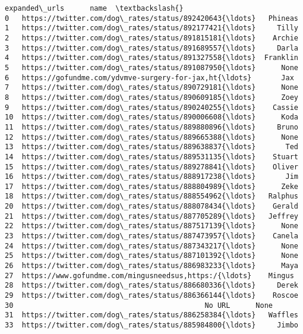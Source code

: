 \documentclass[11pt]{article}
\begin{document}
\begin{Verbatim}[commandchars=\\\{\}]
                                        expanded\_urls      name  \textbackslash{}
0   https://twitter.com/dog\_rates/status/892420643{\ldots}   Phineas   
1   https://twitter.com/dog\_rates/status/892177421{\ldots}     Tilly   
2   https://twitter.com/dog\_rates/status/891815181{\ldots}    Archie   
3   https://twitter.com/dog\_rates/status/891689557{\ldots}     Darla   
4   https://twitter.com/dog\_rates/status/891327558{\ldots}  Franklin   
5   https://twitter.com/dog\_rates/status/891087950{\ldots}      None   
6   https://gofundme.com/ydvmve-surgery-for-jax,ht{\ldots}       Jax   
7   https://twitter.com/dog\_rates/status/890729181{\ldots}      None   
8   https://twitter.com/dog\_rates/status/890609185{\ldots}      Zoey   
9   https://twitter.com/dog\_rates/status/890240255{\ldots}    Cassie   
10  https://twitter.com/dog\_rates/status/890006608{\ldots}      Koda   
11  https://twitter.com/dog\_rates/status/889880896{\ldots}     Bruno   
12  https://twitter.com/dog\_rates/status/889665388{\ldots}      None   
13  https://twitter.com/dog\_rates/status/889638837{\ldots}       Ted   
14  https://twitter.com/dog\_rates/status/889531135{\ldots}    Stuart   
15  https://twitter.com/dog\_rates/status/889278841{\ldots}    Oliver   
16  https://twitter.com/dog\_rates/status/888917238{\ldots}       Jim   
17  https://twitter.com/dog\_rates/status/888804989{\ldots}      Zeke   
18  https://twitter.com/dog\_rates/status/888554962{\ldots}   Ralphus   
20  https://twitter.com/dog\_rates/status/888078434{\ldots}    Gerald   
21  https://twitter.com/dog\_rates/status/887705289{\ldots}   Jeffrey   
22  https://twitter.com/dog\_rates/status/887517139{\ldots}      None   
23  https://twitter.com/dog\_rates/status/887473957{\ldots}    Canela   
24  https://twitter.com/dog\_rates/status/887343217{\ldots}      None   
25  https://twitter.com/dog\_rates/status/887101392{\ldots}      None   
26  https://twitter.com/dog\_rates/status/886983233{\ldots}      Maya   
27  https://www.gofundme.com/mingusneedsus,https:/{\ldots}    Mingus   
28  https://twitter.com/dog\_rates/status/886680336{\ldots}     Derek   
29  https://twitter.com/dog\_rates/status/886366144{\ldots}    Roscoe   
30                                             No URL      None   
31  https://twitter.com/dog\_rates/status/886258384{\ldots}   Waffles   
33  https://twitter.com/dog\_rates/status/885984800{\ldots}     Jimbo   


\end{Verbatim}
\end{document}
